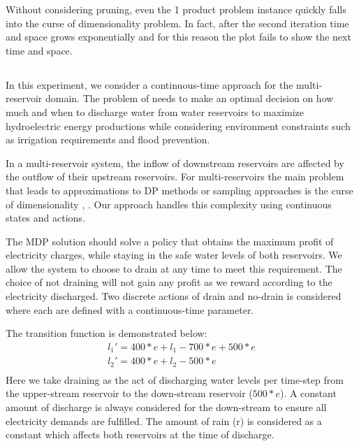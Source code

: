 Without considering pruning, even the 1 product problem instance quickly falls into the curse of dimensionality problem. In fact, after the second iteration time and space grows exponentially and for this reason the plot fails to show the next time and
space.


\subsection{\WaterReservoir}

In this experiment, we consider a continuous-time approach for the multi-reservoir domain. The problem of \WaterReservoir  needs to make an optimal decision on how much and when to discharge water from water reservoirs to maximize hydroelectric energy productions while considering environment constraints such as irrigation requirements and flood prevention. 

In a multi-reservoir system, the inflow of downstream reservoirs are affected by the outflow of their upstream reservoirs. 
For multi-reservoirs the main problem that leads to approximations to DP methods or sampling approaches is the curse of dimensionality \cite{Mahootchi2009}, \cite{Yeh1985}. Our approach handles this complexity using continuous states and actions.


The MDP solution should solve a policy that obtains the maximum profit of electricity charges, while staying in the safe water levels of both reservoirs. We allow the system to choose to drain at any time to meet this requirement. The choice of not draining will not gain any profit as we reward according to the electricity discharged. Two discrete actions of drain and no-drain is considered where each are defined with a continuous-time parameter. 

The transition function is demonstrated below: 
{\footnotesize
\begin{align*}
l_1'  = 400 * e + l_1 -700 * e + 500 * e \\
l_2'  = 400 * e + l_2 - 500 * e \\
\end{align*}
}
Here we take draining as the act of discharging water levels per time-step from the upper-stream reservoir to the down-stream reservoir ($500 * e$). A constant amount of discharge is always considered for the down-stream to ensure all electricity demands are fulfilled.  The amount of rain (r) is considered as a constant which affects both reservoirs at the time of discharge. 

